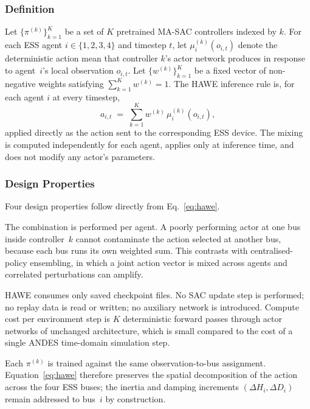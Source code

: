 \documentclass{unnc-fyp}
\begin{document}
\subsubsection{Definition}

Let $\{\pi^{(k)}\}_{k=1}^{K}$ be a set of $K$ pretrained MA-SAC
controllers indexed by $k$.
For each ESS agent $i \in \{1, 2, 3, 4\}$ and timestep $t$, let
$\mu_{i}^{(k)}(o_{i,t})$ denote the deterministic action mean
that controller $k$'s actor network produces in response to
agent~$i$'s local observation $o_{i,t}$.
Let $\{w^{(k)}\}_{k=1}^{K}$ be a fixed vector of non-negative
weights satisfying $\sum_{k=1}^{K} w^{(k)} = 1$.
The HAWE inference rule is, for each agent $i$ at every timestep,
\begin{equation}
  a_{i,t} \;=\; \sum_{k=1}^{K} w^{(k)}\,
                \mu_{i}^{(k)}(o_{i,t}),
  \label{eq:hawe}
\end{equation}
applied directly as the action sent to the corresponding ESS
device.
The mixing is computed independently for each agent, applies only
at inference time, and does not modify any actor's parameters.

\subsubsection{Design Properties}

Four design properties follow directly from
Eq.~\eqref{eq:hawe}.

The combination is performed per agent.
A poorly performing actor at one bus inside controller~$k$ cannot
contaminate the action selected at another bus, because each bus
runs its own weighted sum.
This contrasts with centralised-policy ensembling, in which a
joint action vector is mixed across agents and correlated
perturbations can amplify.

HAWE consumes only saved checkpoint files.
No SAC update step is performed; no replay data is read or
written; no auxiliary network is introduced.
Compute cost per environment step is $K$ deterministic forward
passes through actor networks of unchanged architecture, which is
small compared to the cost of a single ANDES time-domain
simulation step.

Each $\pi^{(k)}$ is trained against the same observation-to-bus
assignment.
Equation~\eqref{eq:hawe} therefore preserves the spatial
decomposition of the action across the four ESS buses; the
inertia and damping increments
$(\Delta H_{i}, \Delta D_{i})$ remain addressed to bus~$i$ by
construction.
\end{document}
